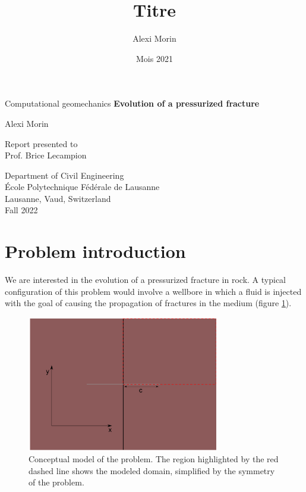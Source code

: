 \documentclass{article}
\title{Titre}
\author{Alexi Morin}
\date{Mois 2021}
\begin{document}
\begin{titlepage}
    \begin{center}
        \vspace*{1cm}
         \Huge  
        Computational geomechanics
         \vspace{0.5cm}
        \textbf{Evolution of a pressurized fracture}
         \vspace{0.5cm}
        \\ 
            
        \vspace{1.5cm}
            
        Alexi Morin
            
        \vfill
            
	Report presented to\\
	Prof. Brice Lecampion
  
        \vspace{2.cm}
            

        \Large

        Department of Civil Engineering\\
        École Polytechnique Fédérale de Lausanne\\
        Lausanne, Vaud, Switzerland\\
        Fall 2022
            
    \end{center}
\end{titlepage}


\section{Problem introduction}
We are interested in the evolution of a pressurized fracture in rock. A typical configuration of this problem would involve a wellbore in which a fluid is injected with the goal of causing the propagation of fractures in the medium (figure \ref{fig:conceptual}). 

\begin{figure}[h]
    \centering
    \includegraphics[width=0.75\textwidth]{fracture}
    \caption{Conceptual model of the problem. The region highlighted by the red dashed line shows the modeled domain, simplified by the symmetry of the problem.}
    \label{fig:conceptual}
\end{figure}
\end{document}
